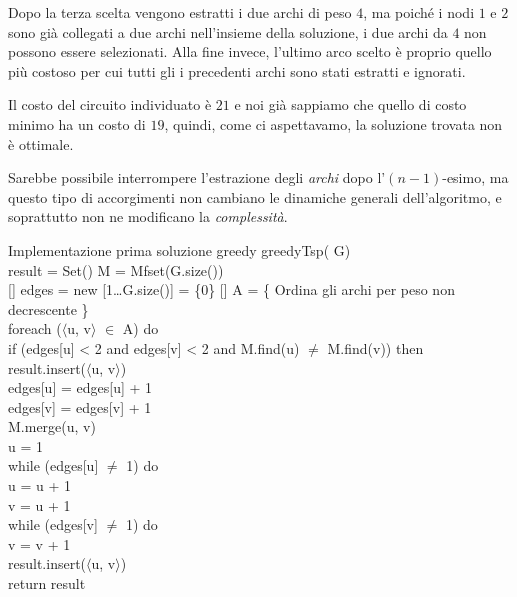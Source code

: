 \begin{eg}
\noindent
Dopo la terza scelta vengono estratti i due archi di peso $4$, ma poiché i nodi
$1$ e $2$ sono già collegati a due archi nell'insieme della soluzione, i due
archi da $4$ non possono essere selezionati. Alla fine invece, l'ultimo arco
scelto è proprio quello più costoso per cui tutti gli i precedenti archi sono
stati estratti e ignorati.

\bigskip\noindent Il costo del circuito individuato è $21$ e noi già sappiamo
che quello di costo minimo ha un costo di $19$, quindi, come ci aspettavamo,
la soluzione trovata non è ottimale.
\end{eg}
\begin{note}
    Sarebbe possibile interrompere l'estrazione degli \emph{archi} dopo
    l'$(n-1)$-esimo, ma questo tipo di accorgimenti non cambiano le dinamiche
    generali dell'algoritmo, e soprattutto non ne modificano la \emph{complessità}.
\end{note}

\begin{minicode}{Implementazione prima soluzione greedy}
\ind{} greedyTsp( G)\\
     result = Set()\hfill{}
     M = Mfset(G.size())\\
    [] edges = new [1\dots G.size()] = \{0\}\hfill{}
    [] A = \{ Ordina gli archi per peso non decrescente \}\\
    \indf foreach ($\langle$u, v$\rangle$ $\in$ A) do\\
        \indff if (edges[u] < 2 and edges[v] < 2 and M.find(u) $\neq$ M.find(v)) then\\
            result.insert($\langle$u, v$\rangle$)\\
            edges[u] = edges[u] + 1\\
            edges[v] = edges[v] + 1\\
            M.merge(u, v)\\
    \indf{}
    \indf{} u = 1\\
    \indf while (edges[u] $\neq$ 1) do\\
        u = u + 1\\
    \indf{} v = u + 1\\
    \indf while (edges[v] $\neq$ 1) do\\
            v = v + 1\\
    \indf result.insert($\langle$u, v$\rangle$)\\
    \indf return result
\end{minicode}

